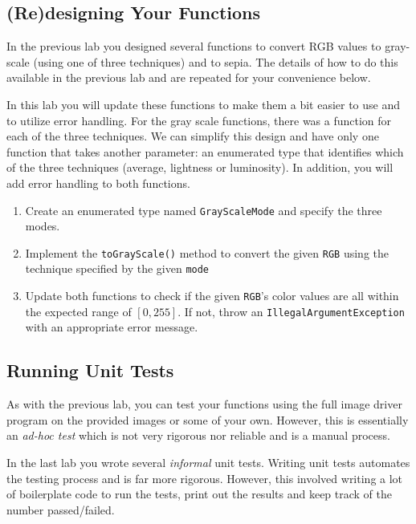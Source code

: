 \documentclass[12pt]{scrartcl}
\begin{document}
\subsection{(Re)designing Your Functions}

In the previous lab you designed several functions to convert RGB
values to gray-scale (using one of three techniques) and to sepia.
The details of how to do this available in the previous lab and 
are repeated for your convenience below.  

In this lab you will update these functions to make them a bit
easier to use and to utilize error handling.  For the
gray scale functions, there was a function for each of the three 
techniques.  We can simplify this design and have only one function
that takes another parameter: an enumerated type that identifies
which of the three techniques (average, lightness or luminosity).
In addition, you will add error handling to both functions.

\begin{enumerate}
  \item Create an enumerated type named \texttt{GrayScaleMode}
  and specify the three modes. 
  \item Implement the \texttt{toGrayScale()} method
  to convert the given \texttt{RGB} using the technique
  specified by the given \texttt{mode}
  \item Update both functions to check if the given \texttt{RGB}'s
  color values are all within the expected range of $[0, 255]$.  If not,
  throw an \texttt{IllegalArgumentException} with an
  appropriate error message.
\end{enumerate}

\subsection{Running Unit Tests}

As with the previous lab, you can test your functions using 
the full image driver program on the provided images or some
of your own.  However, this is essentially an 
\emph{ad-hoc test} which is not very rigorous nor reliable 
and is a manual process.  

In the last lab you wrote several \emph{informal} unit tests.  
Writing unit tests automates the testing process and is far more
rigorous.  However, this involved writing a lot of boilerplate 
code to run the tests, print out the results and keep track 
of the number passed/failed.  
\end{document}
